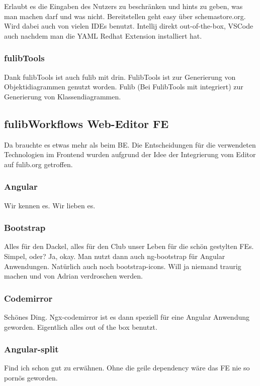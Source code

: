 Erlaubt es die Eingaben des Nutzers zu beschränken und hints zu geben, was man machen darf
und was nicht.
Bereitstellen geht easy über schemastore.org.
Wird dabei auch von vielen IDEs benutzt.
Intellij direkt out-of-the-box, VSCode auch nachdem man die YAML Redhat Extension installiert hat.

\subsubsection{fulibTools}
Dank fulibTools ist auch fulib mit drin.
FulibTools ist zur Generierung von Objektidiagrammen genutzt worden.
Fulib (Bei FulibTools mit integriert) zur Generierung von Klassendiagrammen.

\subsection{fulibWorkflows Web-Editor FE}\label{subsec:fulibworkflows-web-editor}
Da brauchte es etwas mehr als beim BE\@.
Die Entscheidungen für die verwendeten Technologien im Frontend wurden aufgrund
der Idee der Integrierung vom Editor auf fulib.org getroffen.

\subsubsection{Angular}
Wir kennen es.
Wir lieben es.

\subsubsection{Bootstrap}
Alles für den Dackel, alles für den Club unser Leben für die schön gestylten FEs.
Simpel, oder?
Ja, okay.
Man nutzt dann auch ng-bootstrap für Angular Anwendungen.
Natürlich auch noch bootstrap-icons.
Will ja niemand traurig machen und von Adrian verdroschen werden.

\subsubsection{Codemirror}
Schönes Ding.
Ngx-codemirror ist es dann speziell für eine Angular Anwendung geworden.
Eigentlich alles out of the box benutzt.

\subsubsection{Angular-split}
Find ich schon gut zu erwähnen.
Ohne die geile dependency wäre das FE nie so pornös geworden.

